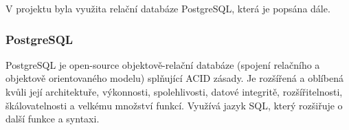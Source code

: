 	V projektu byla využita relační databáze PostgreSQL, která je popsána dále.
	
		\subsubsection{PostgreSQL}
		PostgreSQL je open-source objektově-relační databáze (spojení relačního a objektově orientovaného modelu) splňující ACID zásady. Je rozšířená a oblíbená kvůli její architektuře, výkonnosti, spolehlivosti, datové integritě, rozšířitelnosti, škálovatelnosti a velkému množství funkcí. Využívá jazyk SQL, který rozšiřuje o další funkce a syntaxi. \cite{PostgreSQL}
